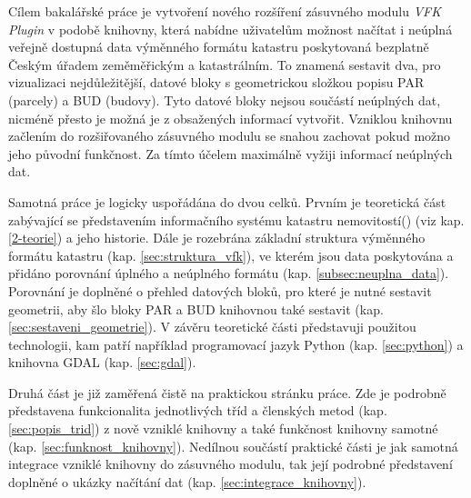 Cílem bakalářské práce je vytvoření nového rozšíření zásuvného modulu
\textit{VFK Plugin} v podobě knihovny, která nabídne uživatelům
možnost načítat i neúplná veřejně dostupná data výměnného formátu
katastru poskytovaná bezplatně Českým úřadem zeměměřickým a
katastrálním.  To znamená sestavit dva, pro vizualizaci
nejdůležitější, datové bloky s geometrickou složkou popisu PAR
(parcely) a BUD (budovy). Tyto datové bloky nejsou součástí neúplných
dat, nicméně přesto je možná je z obsažených informací
vytvořit. Vzniklou knihovnu začlením do rozšiřovaného zásuvného modulu
se snahou zachovat pokud možno jeho původní funkčnost. Za tímto účelem
maximálně vyžiji informací neúplných dat.

Samotná práce je logicky uspořádána do dvou celků. Prvním je
teoretická část zabývající se představením informačního systému
katastru nemovitostí() (viz kap. \ref{2-teorie}) a jeho
historie. Dále je rozebrána základní struktura výměnného formátu
katastru (kap. \ref{sec:struktura_vfk}), ve kterém jsou data
poskytována a přidáno porovnání úplného a neúplného formátu
(kap. \ref{subsec:neuplna_data}).  Porovnání je doplněné o přehled
datových bloků, pro které je nutné sestavit geometrii, aby šlo bloky
PAR a BUD knihovnou také sestavit
(kap. \ref{sec:sestaveni_geometrie}). V závěru teoretické části
představuji použitou technologii, kam patří například programovací
jazyk Python (kap. \ref{sec:python}) a knihovna GDAL
(kap. \ref{sec:gdal}).

Druhá část je již zaměřená čistě na praktickou stránku práce. Zde je
podrobně představena funkcionalita jednotlivých tříd a členských metod
(kap. \ref{sec:popis_trid}) z nově vzniklé knihovny a také funkčnost
knihovny samotné (kap. \ref{sec:funknost_knihovny}). Nedílnou součástí
praktické části je jak samotná integrace vzniklé knihovny do zásuvného
modulu, tak její podrobné představení doplněné o ukázky načítání dat
(kap. \ref{sec:integrace_knihovny}).
